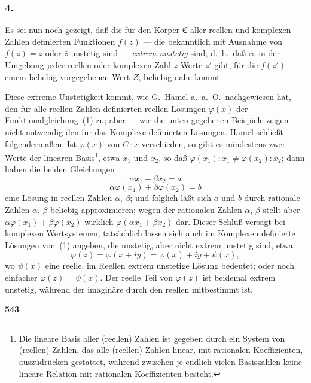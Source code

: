 \documentclass[12pt,a4paper]{article}
\begin{document}
\subsubsection*{4.}

Es sei nun noch gezeigt, da\ss{} die f\"ur den K\"orper $\mathfrak{C}$ aller reellen und komplexen Zahlen definierten Funktionen $f(z)$ --- die bekanntlich mit Ausnahme von $f(z) = z$ oder $\bar{z}$ unstetig sind --- \emph{extrem unstetig} sind, d.\ h.\ da\ss{} es in der Umgebung jeder reellen oder komplexen Zahl $z$ Werte $z'$ gibt, f\"ur die $f(z')$ einem beliebig vorgegebenen Wert $Z$, beliebig nahe kommt.

Diese extreme Unstetigkeit kommt, wie G.\ Hamel a.\ a.\ O.\ nachgewiesen hat, den f\"ur alle reellen Zahlen definierten reellen L\"osungen $\varphi(x)$ der Funktionalgleichung~(1) zu; aber --- wie die unten gegebenen Beispiele zeigen --- nicht notwendig den f\"ur das Komplexe definierten L\"osungen. Hamel schlie\ss t folgenderma\ss en: Ist $\varphi(x)$ von $C \cdot x$ verschieden, so gibt es mindestens zwei Werte der linearen Basis\footnote{Die lineare Basis aller (reellen) Zahlen ist gegeben durch ein System von (reellen) Zahlen, das alle (reellen) Zahlen linear, mit rationalen Koeffizienten, auszudr\"ucken gestattet, w\"ahrend zwischen je endlich vielen Basiszahlen keine lineare Relation mit rationalen Koeffizienten besteht.}, etwa $x_1$ und $x_2$, so da\ss{} $\varphi(x_1) : x_1 \neq \varphi(x_2) : x_2$; dann haben die beiden Gleichungen
\[\alpha x_1 + \beta x_2 = a\]
\[\alpha \varphi(x_1) + \beta \varphi(x_2) = b\]
eine L\"osung in reellen Zahlen $\alpha$, $\beta$; und folglich l\"a\ss t sich $a$ und $b$ durch rationale Zahlen $\alpha$, $\beta$ beliebig approximieren; wegen der rationalen Zahlen $\alpha$, $\beta$ stellt aber $\alpha \varphi(x_1) + \beta \varphi(x_2)$ wirklich $\varphi(\alpha x_1 + \beta x_2)$ dar. Dieser Schlu\ss{} versagt bei komplexen Wertsystemen; tats\"achlich lassen sich auch im Komplexen definierte L\"osungen von~(1) angeben, die unstetig, aber nicht extrem unstetig sind, etwa:
\[\varphi(z) = \varphi(x+iy) = \varphi(x) + iy + \psi(x),\]
wo $\psi(x)$ eine reelle, im Reellen extrem unstetige L\"osung bedeutet; oder noch einfacher $\varphi(z) = \psi(x)$. Der reelle Teil von $\varphi(z)$ ist beidemal extrem unstetig, w\"ahrend der imagin\"are durch den reellen mitbestimmt ist.

\newpage
\begin{center}
\textbf{543}
\end{center}
\end{document}
